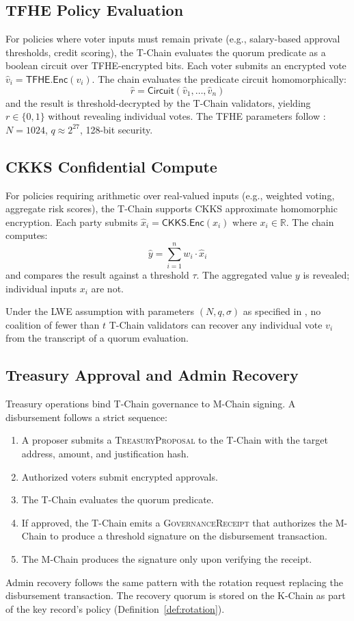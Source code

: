 \subsection{TFHE Policy Evaluation}

For policies where voter inputs must remain private (e.g., salary-based approval
thresholds, credit scoring), the T-Chain evaluates the quorum predicate as a
boolean circuit over TFHE-encrypted bits. Each voter submits an encrypted vote
$\hat{v}_i = \mathsf{TFHE.Enc}(v_i)$. The chain evaluates the predicate
circuit homomorphically:
\[
    \hat{r} = \mathsf{Circuit}(\hat{v}_1, \ldots, \hat{v}_n)
\]
and the result is threshold-decrypted by the T-Chain validators, yielding
$r \in \{0, 1\}$ without revealing individual votes. The TFHE parameters
follow \cite{lux-tfhe}: $N = 1024$, $q \approx 2^{27}$, 128-bit security.

\subsection{CKKS Confidential Compute}

For policies requiring arithmetic over real-valued inputs (e.g., weighted voting,
aggregate risk scores), the T-Chain supports CKKS approximate homomorphic encryption.
Each party submits $\hat{x}_i = \mathsf{CKKS.Enc}(x_i)$ where $x_i \in \mathbb{R}$.
The chain computes:
\[
    \hat{y} = \sum_{i=1}^{n} w_i \cdot \hat{x}_i
\]
and compares the result against a threshold $\tau$. The aggregated value $y$ is
revealed; individual inputs $x_i$ are not.

\begin{proposition}\label{prop:vote-privacy}
Under the LWE assumption with parameters $(N, q, \sigma)$ as specified in
\cite{lux-pq-crypto-suite}, no coalition of fewer than $t$ T-Chain validators
can recover any individual vote $v_i$ from the transcript of a quorum evaluation.
\end{proposition}

\subsection{Treasury Approval and Admin Recovery}

Treasury operations bind T-Chain governance to M-Chain signing. A disbursement
follows a strict sequence:

\begin{enumerate}
    \item A proposer submits a \textsc{TreasuryProposal} to the T-Chain with
          the target address, amount, and justification hash.
    \item Authorized voters submit encrypted approvals.
    \item The T-Chain evaluates the quorum predicate.
    \item If approved, the T-Chain emits a \textsc{GovernanceReceipt} that
          authorizes the M-Chain to produce a threshold signature on the
          disbursement transaction.
    \item The M-Chain produces the signature only upon verifying the receipt.
\end{enumerate}

Admin recovery follows the same pattern with the rotation request replacing the
disbursement transaction. The recovery quorum is stored on the K-Chain as part
of the key record's policy (Definition~\ref{def:rotation}).

